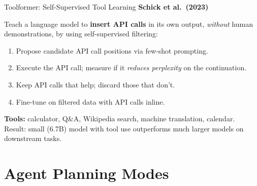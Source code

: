 \documentclass[aspectratio=169,10pt]{beamer}
\begin{document}
\begin{frame}{Toolformer: Self-Supervised Tool Learning}
  \textbf{Schick et al.\ (2023)}~\cite{schick2023toolformer}
  \vspace{0.4em}
  \begin{tcolorbox}[hitbox, title=Key Idea]
    Teach a language model to \textbf{insert API calls} in its own output, \emph{without} human
    demonstrations, by using self-supervised filtering:
    \begin{enumerate}
      \item Propose candidate API call positions via few-shot prompting.
      \item Execute the API call; measure if it \emph{reduces perplexity} on the continuation.
      \item Keep API calls that help; discard those that don't.
      \item Fine-tune on filtered data with API calls inline.
    \end{enumerate}
  \end{tcolorbox}
  \vspace{0.3em}
  \textbf{Tools:} calculator, Q\&A, Wikipedia search, machine translation, calendar.\\
  Result: small (6.7B) model with tool use outperforms much larger models on downstream tasks.
\end{frame}

\section{Agent Planning Modes}
\end{document}
